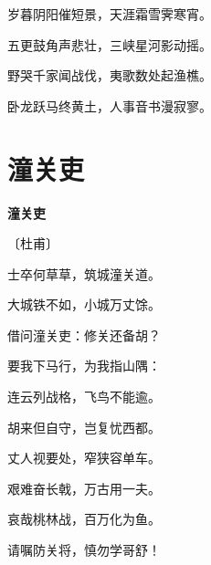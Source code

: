 \documentclass[12pt,UTF-8,openany,fontset=none]{ctexbook}
\begin{document}
    \vspace{18pt}  %

\begin{center}
    \begin{Large}

        岁暮阴阳催短景，天涯霜雪霁寒宵。

        五更鼓角声悲壮，三峡星河影动摇。

        野哭千家闻战伐，夷歌数处起渔樵。

        卧龙跃马终黄土，人事音书漫寂寥。

    \end{Large}

\end{center}

\vspace{8pt}
\clearpage

\section{潼关吏}


\begin{center}
    {\bfseries 潼关吏}

    \vspace{18pt}

    \begin{large}\xuwen
        〔杜甫〕
    \end{large}

\end{center}

    \vspace{18pt}  %

\begin{center}
    \begin{Large}

        士卒何草草，筑城潼关道。

        大城铁不如，小城万丈馀。

        借问潼关吏：修关还备胡？

        要我下马行，为我指山隅：

        连云列战格，飞鸟不能逾。

        胡来但自守，岂复忧西都。

        丈人视要处，窄狭容单车。

        艰难奋长戟，万古用一夫。

        哀哉桃林战，百万化为鱼。

        请嘱防关将，慎勿学哥舒！

    \end{Large}

\end{center}
\end{document}
